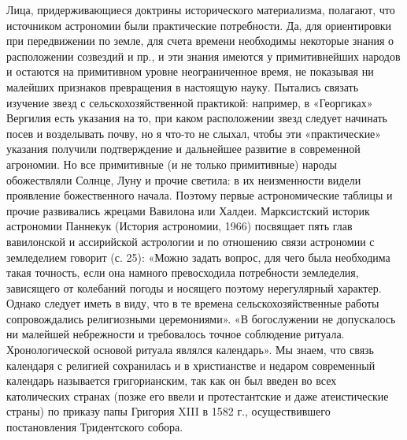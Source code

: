 Лица, придерживающиеся доктрины  исторического материализма, полагают,
что  источником  астрономии  были практические  потребности.  Да,  для
ориентировки при  передвижении по земле, для  счета времени необходимы
некоторые  знания  о  расположении  созвездий  и  пр.,  и  эти  знания
имеются   у  примитивнейших   народов   и   остаются  на   примитивном
уровне  неограниченное  время,  не  показывая  ни  малейших  признаков
превращения  в  настоящую науку.  Пытались  связать  изучение звезд  с
сельскохозяйственной практикой: например,  в «Георгиках» Вергилия есть
указания на то, при каком  расположении звезд следует начинать посев и
возделывать почву,  но я  что-то не  слыхал, чтобы  эти «практические»
указания получили  подтверждение и  дальнейшее развитие  в современной
агрономии.  Но  все  примитивные  (и  не  только  примитивные)  народы
обожествляли  Солнце,  Луну  и   прочие  светила:  в  их  неизменности
видели проявление божественного начала. Поэтому первые астрономические
таблицы и прочие развивались жрецами Вавилона или Халдеи. Марксистский
историк  астрономии  Паннекук  (История  астрономии,  1966)  посвящает
пять  глав  вавилонской  и   ассирийской  астрологии  и  по  отношению
связи  астрономии  с  земледелием   говорит  (с.  25):  «Можно  задать
вопрос,  для чего  была необходима  такая точность,  если она  намного
превосходила  потребности земледелия,  зависящего от  колебаний погоды
и  носящего  поэтому нерегулярный  характер.  Однако  следует иметь  в
виду,  что в  те  времена  сельскохозяйственные работы  сопровождались
религиозными церемониями». «В богослужении  не допускалось ни малейшей
небрежности и  требовалось точное соблюдение  ритуала. Хронологической
основой ритуала  являлся календарь». Мы  знаем, что связь  календаря с
религией сохранилась и в  христианстве и недаром современный календарь
называется григорианским, так  как он был введен  во всех католических
странах (позже его ввели и протестантские и даже атеистические страны)
по приказу папы Григория XIII  в 1582 г., осуществившего постановления
Тридентского собора.

